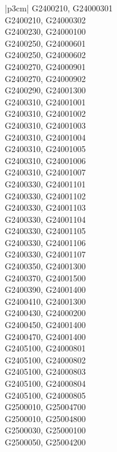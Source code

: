 \begin{customLongTable}{ |p{3cm}| }
G2400210, G24000301 \\ \hline
G2400210, G24000302 \\ \hline
G2400230, G24000100 \\ \hline
G2400250, G24000601 \\ \hline
G2400250, G24000602 \\ \hline
G2400270, G24000901 \\ \hline
G2400270, G24000902 \\ \hline
G2400290, G24001300 \\ \hline
G2400310, G24001001 \\ \hline
G2400310, G24001002 \\ \hline
G2400310, G24001003 \\ \hline
G2400310, G24001004 \\ \hline
G2400310, G24001005 \\ \hline
G2400310, G24001006 \\ \hline
G2400310, G24001007 \\ \hline
G2400330, G24001101 \\ \hline
G2400330, G24001102 \\ \hline
G2400330, G24001103 \\ \hline
G2400330, G24001104 \\ \hline
G2400330, G24001105 \\ \hline
G2400330, G24001106 \\ \hline
G2400330, G24001107 \\ \hline
G2400350, G24001300 \\ \hline
G2400370, G24001500 \\ \hline
G2400390, G24001400 \\ \hline
G2400410, G24001300 \\ \hline
G2400430, G24000200 \\ \hline
G2400450, G24001400 \\ \hline
G2400470, G24001400 \\ \hline
G2405100, G24000801 \\ \hline
G2405100, G24000802 \\ \hline
G2405100, G24000803 \\ \hline
G2405100, G24000804 \\ \hline
G2405100, G24000805 \\ \hline
G2500010, G25004700 \\ \hline
G2500010, G25004800 \\ \hline
G2500030, G25000100 \\ \hline
G2500050, G25004200 \\ \hline

\end{customLongTable}
